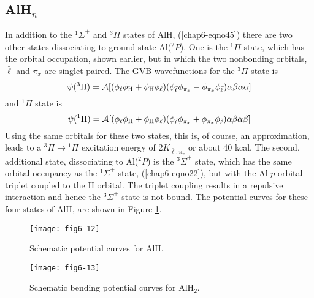 \subsection{AlH$_n$}

In addition to the ${^1\Sigma}^+$ and ${^3\Pi}$ states of AlH,
(\ref{chap6-eqno45}) there are two other states dissociating to ground
state Al(${^2P}$). One is the ${^1\Pi}$ state, which has the orbital
occupation, shown earlier, but in which the two nonbonding orbitals,
${\bar{\ell}}$ and $\pi_x$ are singlet-paired.  The GVB
wavefunctions for the ${^3\Pi}$ state is
\begin{equation}
\psi ( {^3\Pi} ) = {\cal A} [ ( \phi_{\ell} \phi_\mathrm{H} + \phi_\mathrm{H} 
\phi_{\ell} ) ( \phi_{\bar{\ell}} \phi_{\pi_x} - \phi_{\pi_x} 
\phi_{\bar{\ell}} ) \alpha \beta \alpha \alpha ]
\end{equation}
and ${^1\Pi}$ state is
\begin{equation}
\psi ( {^1\Pi} ) = {\cal A} [ ( \phi_{\ell} \phi_\mathrm{H} + \phi_\mathrm{H} 
\phi_{\ell} ) ( \phi_{\bar{\ell}} \phi_{\pi_x} + \phi_{\pi_x} 
\phi_{\bar{\ell}} ) \alpha \beta \alpha \beta ]
\end{equation}
Using the same orbitals for these two states, this is, of course, an
approximation, leads to a ${^3\Pi} \rightarrow {^1\Pi}$ excitation
energy of $2K_{{\bar{\ell}},\pi_x}$ or about 40 kcal.  The second,
additional state, dissociating to Al(${^2P}$) is the ${^3\Sigma}^+$
state, which has the same orbital occupancy as the ${^1\Sigma}^+$
state, (\ref{chap6-eqno22}), but with the Al $p$ orbital triplet
coupled to the H orbital. The triplet coupling results in a repulsive
interaction and hence the ${^3\Sigma}^+$ state is not bound. The
potential curves for these four states of AlH, are shown in Figure
\ref{chap6-fig13}.

\begin{figure}
\texttt{[image: fig6-12]}
\caption{Schematic potential curves for AlH.}
\label{chap6-fig13}
\end{figure}

\begin{figure}
\texttt{[image: fig6-13]}
\caption{Schematic bending potential curves for AlH$_2$.}
\label{chap6-fig14}
\end{figure}

